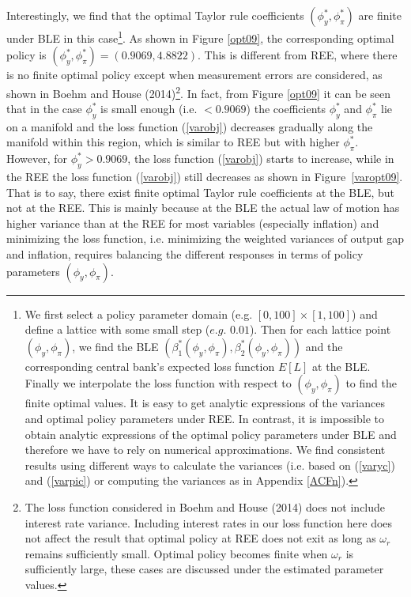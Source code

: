     Interestingly, we find that the optimal Taylor rule coefficients $(\phi_y^*, \phi_\pi^*)$ are finite under BLE in this case\footnote{
We first select a policy parameter domain (e.g. $[0,100]\times[1,100]$) and define a lattice with some small step ($e.g. \,\,0.01$). Then for each lattice point $(\phi_y, \phi_\pi)$, we find the BLE $(\beta_1^*(\phi_y, \phi_\pi), \beta_2^*(\phi_y, \phi_\pi))$ and the corresponding central bank's expected loss function $E[L]$ at the BLE. Finally we interpolate the loss function with respect to $(\phi_y, \phi_\pi)$ to find the finite optimal values. It is easy to get analytic expressions of the variances and optimal policy parameters under REE. In contrast, it is impossible to obtain analytic expressions of the optimal policy parameters under BLE and  therefore we have to rely on numerical approximations. We find consistent results using different ways to calculate the variances (i.e. based on (\ref{varyc}) and (\ref{varpic}) or computing the variances as in Appendix \ref{ACFn}).}.
As shown in Figure \ref{opt09}, the corresponding optimal policy is $(\phi_y^*, \phi_\pi^*)=(0.9069, 4.8822)$. This is different from REE, where there is no finite optimal policy except when measurement errors are considered, as shown in Boehm and House (2014)\footnote{The loss function considered in Boehm and House (2014) does not include interest rate variance. Including interest rates in our loss function here does not affect the result that optimal policy at REE does not exit as long as $\omega_r$ remains sufficiently small. Optimal policy becomes finite when $\omega_r$ is sufficiently large, these cases are discussed under the estimated parameter values.}. In fact, from Figure \ref{opt09} it can be seen that in the case $\phi_y^*$ is small enough (i.e. $<0.9069$) the coefficients $\phi_y^*$ and $\phi_\pi^*$ lie on a manifold and the loss function (\ref{varobj}) decreases gradually along the manifold within this region, which is similar to REE but with higher $\phi_\pi^*$. However, for $\phi_y^*>0.9069$, the loss function (\ref{varobj}) starts to increase, while in the REE the loss function (\ref{varobj}) still decreases as shown in Figure~\ref{varopt09}. That is to say, there exist finite optimal Taylor rule coefficients at the BLE, but not at the REE. This is mainly because at the BLE the actual law of motion has higher variance than at the REE for most variables (especially inflation) and minimizing the loss function, i.e. minimizing the weighted variances of output gap and inflation, requires balancing the different responses in terms of policy parameters $(\phi_y, \phi_\pi)$.


